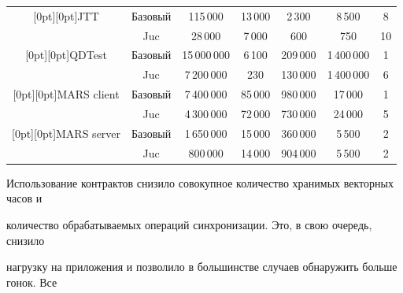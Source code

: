\begin{table}[h]
\begin{center}
\begin{tabular}{|c|c|c|c|c|c|c|}
\hline

\multicolumn{1}{|c|}{\raisebox{-6pt}[0pt][0pt]{JTT}}& Базовый & \hphantom{9}115\,000 & 13\,000&

\hphantom{99}2\,300 &\hphantom{\,}8\,500& 8\\

&Juc & \hphantom{99}28\,000& \hphantom{9}7\,000& \hphantom{999}600& \hphantom{9\,}750& 10\hphantom{9}\\

\hline

\multicolumn{1}{|c|}{\raisebox{-6pt}[0pt][0pt]{QDTest }}& Базовый & 15\,000\,000\hphantom{9} &

\hphantom{9}6\,100 & 209\,000& 1\,400\,000\hphantom{99\,} &1\\

&Juc &  7\,200\,000 & \hphantom{99\,}230 & 130\,000 & 1\,400\,000\hphantom{99\,} &6\\

\hline

\multicolumn{1}{|c|}{\raisebox{-6pt}[0pt][0pt]{MARS client}} & Базовый & 7\,400\,000& 85\,000& 980\,000 & 17\,000 & 1\\

&Juc & 4\,300\,000 & 72\,000& 730\,000& 24\,000& 5\\

\hline

\multicolumn{1}{|c|}{\raisebox{-6pt}[0pt][0pt]{MARS server}} & Базовый & 1\,650\,000& 15\,000& 360\,000& \hphantom{9}5\,500& 2\\

&Juc& \hphantom{9\,}800\,000& 14\,000& 904\,000& \hphantom{9}5\,500& 2\\

\hline

\end{tabular}

\end{center}

\vspace*{-12pt}

\end{table}





Использование контрактов снизило совокупное количество хранимых векторных часов и

количество обрабатываемых операций синхронизации. Это, в свою очередь, снизило

нагрузку на приложения и позволило в большинстве случаев обнаружить больше гонок. Все

